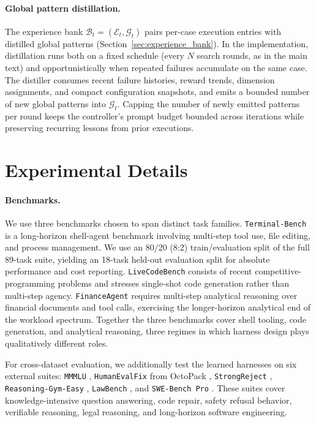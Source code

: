 \documentclass{article}
\begin{document}
\paragraph{Global pattern distillation.}
The experience bank $\mathcal{B}_t = (\mathcal{E}_t, \mathcal{G}_t)$
pairs per-case execution entries with distilled global patterns
(Section~\ref{sec:experience_bank}). In the implementation,
distillation runs both on a fixed schedule (every $N$ search rounds,
as in the main text) and opportunistically when repeated failures
accumulate on the same case. The distiller consumes recent failure
histories, reward trends, dimension assignments, and compact
configuration snapshots, and emits a bounded number of new global
patterns into $\mathcal{G}_t$. Capping the number of newly emitted
patterns per round keeps the controller's prompt budget bounded
across iterations while preserving recurring lessons from prior
executions.

\section{Experimental Details}
\label{app:experimental_details}

\paragraph{Benchmarks.}
We use three benchmarks chosen to span distinct task families.
\texttt{Terminal-Bench} is a long-horizon shell-agent benchmark
involving multi-step tool use, file editing, and process management. We
use an 80/20 (8:2) train/evaluation split of the full 89-task suite,
yielding an 18-task held-out evaluation split for absolute performance
and cost reporting. \texttt{LiveCodeBench} consists of recent
competitive-programming problems and stresses single-shot code
generation rather than multi-step agency. \texttt{FinanceAgent}
requires multi-step analytical reasoning over financial documents and
tool calls, exercising the longer-horizon analytical end of the
workload spectrum. Together the three benchmarks cover shell tooling,
code generation, and analytical reasoning, three regimes in which
harness design plays qualitatively different roles.

For cross-dataset evaluation, we additionally test the learned
harnesses on six external suites: \texttt{MMMLU}
\citep{hendryckstest2021}, \texttt{HumanEvalFix} from OctoPack
\citep{muennighoff2024octopack}, \texttt{StrongReject}
\citep{souly2024a}, \texttt{Reasoning-Gym-Easy}
\citep{stojanovski2026reasoning}, \texttt{LawBench}
\citep{fei-etal-2024-lawbench}, and \texttt{SWE-Bench Pro}
\citep{deng2026swebench}. These suites cover knowledge-intensive
question answering, code repair, safety refusal behavior, verifiable
reasoning, legal reasoning, and long-horizon software engineering.
\end{document}
